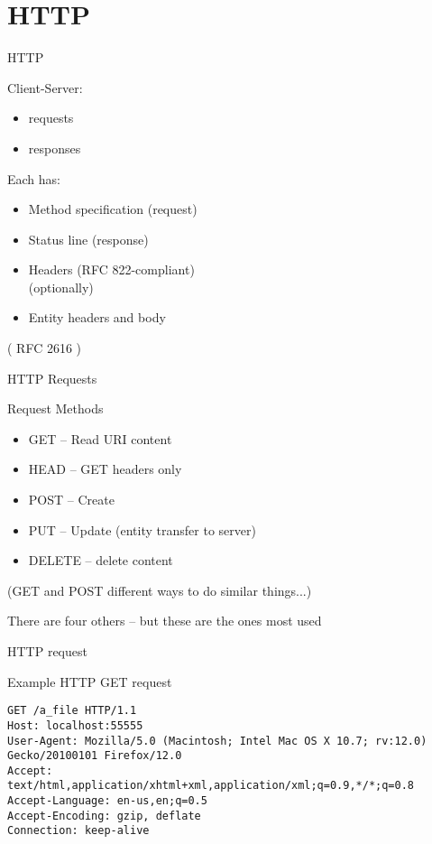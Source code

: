 \documentclass{beamer}
\begin{document}
\section{HTTP}

\begin{frame}[fragile]{HTTP}

\vfill
{\Large Client-Server: }
\begin{itemize}
  \item requests
  \item responses
\end{itemize}

{\Large Each has:}

\begin{itemize}
  \item Method specification (request)
  \item Status line (response)
  \item  Headers (RFC 822-compliant)\\[0.1in]
  (optionally)
  \item Entity headers and body
\end{itemize}
 
\vfill
 ( RFC 2616 )

\end{frame} 

\begin{frame}{HTTP Requests}

{\Large Request Methods  }

\begin{itemize}
  \item GET  -- Read URI content
  \item HEAD -- GET headers only
  \item POST -- Create
  \item PUT  -- Update (entity transfer to server)
  \item DELETE  -- delete content
\end{itemize}
(GET and POST different ways to do similar things...)

\vfill
There are four others -- but these are the ones most used
\end{frame}

\begin{frame}[fragile]{HTTP request}

{\Large Example HTTP GET request}
\begin{verbatim}
GET /a_file HTTP/1.1
Host: localhost:55555
User-Agent: Mozilla/5.0 (Macintosh; Intel Mac OS X 10.7; rv:12.0) Gecko/20100101 Firefox/12.0
Accept: text/html,application/xhtml+xml,application/xml;q=0.9,*/*;q=0.8
Accept-Language: en-us,en;q=0.5
Accept-Encoding: gzip, deflate
Connection: keep-alive
\end{verbatim}

\end{frame}
\end{document}
